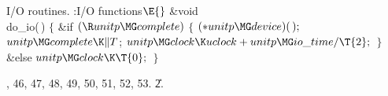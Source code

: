 I/O routines.
\Y\B\4:I/O functions\X${}\E{}$\6
\&{void} \\{do\_io}(\,)\6
${}\{{}$\1\6
\&{if} ${}(\R\\{unitp}\MG\\{complete}){}$\5
${}\{{}$\1\6
${}({*}\\{unitp}\MG\\{device})(\,);{}$\6
${}\\{unitp}\MG\\{complete}\K\|T{}$;\6
${}\\{unitp}\MG\\{clock}\K\\{uclock}+\\{unitp}\MG\\{io\_time}/\T{2};{}$\6
\4${}\}{}$\2\6
\&{else}\1\5
${}\\{unitp}\MG\\{clock}\K\T{0};{}$\2\6
\4${}\}{}$\2\par
{}, 46, 47, 48, 49, 50, 51, 52, 53.
\U2.\fi

